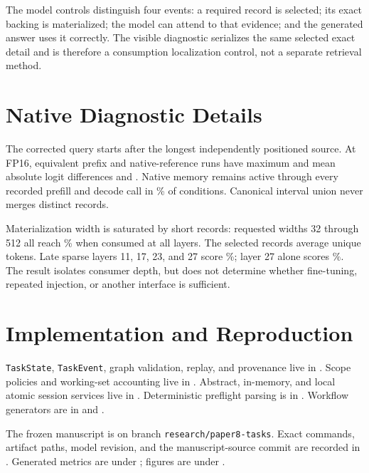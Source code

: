 \documentclass[10pt]{article}
\begin{document}
The model controls distinguish four events: a required record is selected; its exact backing is materialized; the model can attend to that evidence; and the generated answer uses it correctly. The visible diagnostic serializes the same selected exact detail and is therefore a consumption localization control, not a separate retrieval method.

\section{Native Diagnostic Details}\label{app:native-details}
The corrected query starts after the longest independently positioned source. At FP16, equivalent prefix and native-reference runs have maximum and mean absolute logit differences \NativeBugPrefixMaxError{} and \NativeBugPrefixMeanError{}. Native memory remains active through every recorded prefill and decode call in \NativeBugDecodeLifetimePass\% of conditions. Canonical interval union never merges distinct records.

Materialization width is saturated by short records: requested widths 32 through 512 all reach \NativeBugSelectedFullAccuracy\% when consumed at all layers. The selected records average \NativeBugSelectedTokens{} unique tokens. Late sparse layers 11, 17, 23, and 27 score \NativeBugSparseFourAccuracy\%; layer 27 alone scores \NativeBugLateOneAccuracy\%. The result isolates consumer depth, but does not determine whether fine-tuning, repeated injection, or another interface is sufficient.

\section{Implementation and Reproduction}\label{app:reproduction}
\texttt{TaskState}, \texttt{TaskEvent}, graph validation, replay, and provenance live in . Scope policies and working-set accounting live in . Abstract, in-memory, and local atomic session services live in . Deterministic preflight parsing is in . Workflow generators are in  and .

The frozen manuscript is on branch \texttt{research/paper8-tasks}. Exact commands, artifact paths, model revision, and the manuscript-source commit are recorded in . Generated metrics are under ; figures are under .
\end{document}
